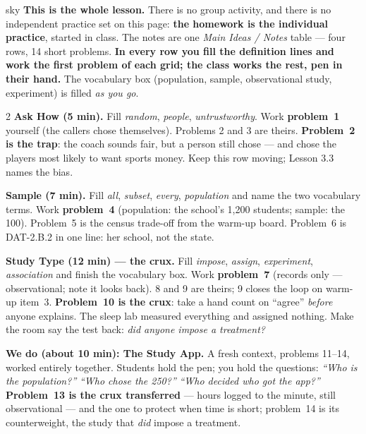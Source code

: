 \documentclass[10pt]{article}
\begin{document}
\boxguard
\begin{skillbox}{sky}
\textbf{This is the whole lesson.} There is no group activity, and there is no independent
practice set on this page: \textbf{the homework is the individual practice}, started in class.
The notes are one \emph{Main Ideas / Notes} table --- four rows, 14 short problems.
\textbf{In every row you fill the definition lines and work the first problem of each grid; the
class works the rest, pen in their hand.} The vocabulary box (population, sample,
observational study, experiment) is filled \emph{as you go}.
\begin{multicols}{2}
\textbf{Ask How (5 min).} Fill \emph{random}, \emph{people}, \emph{untrustworthy}. Work
\textbf{problem~1} yourself (the callers chose themselves). Problems 2 and 3 are theirs.
\textbf{Problem~2 is the trap}: the coach sounds fair, but a person still chose --- and chose
the players most likely to want sports money. Keep this row moving; Lesson 3.3 names the bias.

\textbf{Sample (7 min).} Fill \emph{all}, \emph{subset}, \emph{every}, \emph{population} and
name the two vocabulary terms. Work \textbf{problem~4} (population: the school's 1{,}200
students; sample: the 100). Problem~5 is the census trade-off from the warm-up board.
Problem~6 is DAT-2.B.2 in one line: her school, not the state.

\textbf{Study Type (12 min) --- the crux.} Fill \emph{impose}, \emph{assign},
\emph{experiment}, \emph{association} and finish the vocabulary box. Work \textbf{problem~7}
(records only --- observational; note it looks back). 8 and 9 are theirs; 9 closes the loop on
warm-up item~3. \textbf{Problem~10 is the crux}: take a hand count on ``agree'' \emph{before}
anyone explains. The sleep lab measured everything and assigned nothing. Make the room say the
test back: \emph{did anyone impose a treatment?}

\columnbreak
\textbf{We do (about 10 min): The Study App.} A fresh context, problems 11--14, worked
entirely together. Students hold the pen; you hold the questions: \emph{``Who is the
population?''} \quad \emph{``Who chose the 250?''} \quad \emph{``Who decided who got the
app?''} \textbf{Problem~13 is the crux transferred} --- hours logged to the minute, still
observational --- and the one to protect when time is short; problem~14 is its counterweight,
the study that \emph{did} impose a treatment.


\end{multicols}
\end{skillbox}
\end{document}
